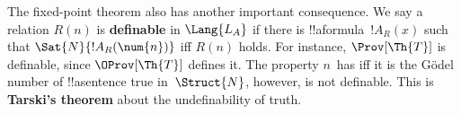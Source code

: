 The fixed-point theorem also has another important consequence. We say
a relation $R(n)$ is \textbf{definable} in $\Lang{L_A}$ if there is
!!a{formula}~$!A_R(x)$ such that $\Sat{N}{!A_R(\num{n})}$ iff $R(n)$
holds. For instance, $\Prov[\Th{T}]$ is definable, since
$\OProv[\Th{T}]$ defines it. The property $n$~has iff it is the
G\"odel number of !!a{sentence} true in~$\Struct{N}$, however, is not
definable. This is \textbf{Tarski's theorem} about the undefinability
of truth.
